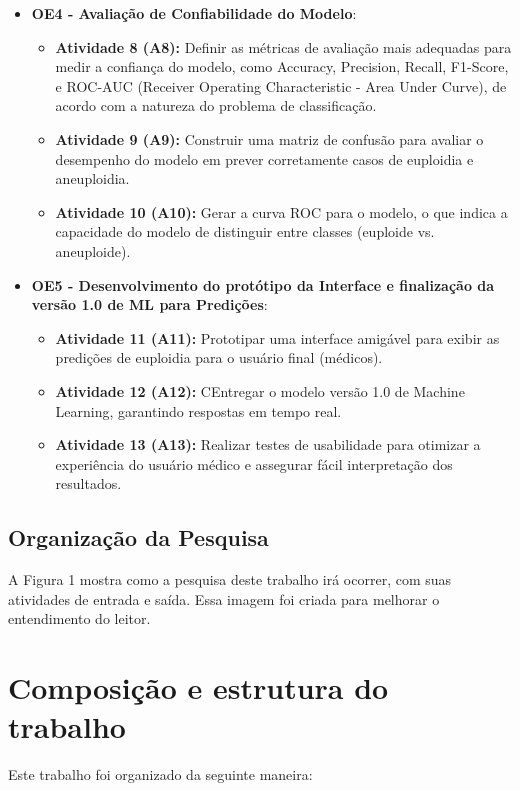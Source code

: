 \begin{itemize}
\begin{itemize}
        \item \textbf{OE4 - Avaliação de Confiabilidade do Modelo}: 
        \begin{itemize}
            \item \textbf{Atividade 8 (A8):} Definir as métricas de avaliação mais adequadas para medir a confiança do modelo, como Accuracy, Precision, Recall, F1-Score, e ROC-AUC (Receiver Operating Characteristic - Area Under Curve), de acordo com a natureza do problema de classificação.
            \item \textbf{Atividade 9 (A9):} Construir uma matriz de confusão para avaliar o desempenho do modelo em prever corretamente casos de euploidia e aneuploidia.
            \item \textbf{Atividade 10 (A10):} Gerar a curva ROC para o modelo, o que indica a capacidade do modelo de distinguir entre classes (euploide vs. aneuploide).
        \end{itemize}

        \item \textbf{OE5 - Desenvolvimento do protótipo da Interface e finalização da versão 1.0 de ML para Predições}: 
        \begin{itemize}
            \item \textbf{Atividade 11 (A11):} Prototipar uma interface amigável para exibir as predições de euploidia para o usuário final (médicos).
            \item \textbf{Atividade 12 (A12):} CEntregar o modelo versão 1.0 de Machine Learning, garantindo respostas em tempo real.
            \item \textbf{Atividade 13 (A13):} Realizar testes de usabilidade para otimizar a experiência do usuário médico e assegurar fácil interpretação dos resultados.
        \end{itemize}
    \end{itemize}
\end{itemize}

\subsection{Organização da Pesquisa}
A Figura 1 mostra como a pesquisa deste trabalho irá ocorrer, com suas atividades de entrada e saída. Essa imagem foi criada para melhorar o entendimento do leitor.

\section{Composição e estrutura do trabalho}
Este trabalho foi organizado da seguinte maneira:

